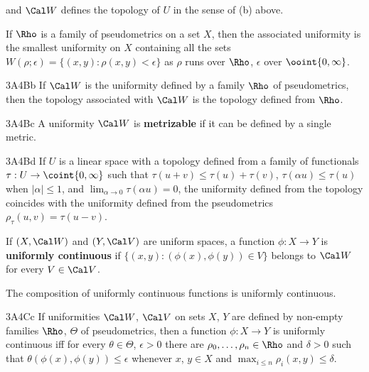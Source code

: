 \noindent and $\Cal W$ defines the topology of $U$ in the sense of (b) 
above.

 If $\Rho$ is a family
of pseudometrics on a set $X$, then the associated uniformity is the
smallest uniformity on $X$ containing all the sets
$W(\rho;\epsilon)=\{(x,y):\rho(x,y)<\epsilon\}$
as $\rho$ runs over $\Rho$, $\epsilon$ over $\ooint{0,\infty}$.

\spheader 3A4Bb If $\Cal W$ is the uniformity defined by a family $\Rho$
of pseudometrics, then the topology associated with $\Cal W$ is the
topology defined from $\Rho$.

\spheader 3A4Bc A uniformity $\Cal W$ is {\bf metrizable} if it can be
defined by a single metric.

\spheader 3A4Bd If $U$ is a linear space with a topology defined from a
family of functionals $\tau:U\to\coint{0,\infty}$ such that
$\tau(u+v)\le\tau(u)+\tau(v)$, $\tau(\alpha u)\le\tau(u)$ when
$|\alpha|\le 1$, and
$\lim_{\alpha\to 0}\tau(\alpha u)=0$, the
uniformity defined from the topology coincides with
the uniformity defined from the pseudometrics
$\rho_{\tau}(u,v)=\tau(u-v)$.   

 If $(X,\Cal W)$ and $(Y,\Cal V)$
are uniform spaces, a function $\phi:X\to Y$ is {\bf uniformly
continuous} if $\{(x,y):(\phi(x),\phi(y))\in V\}$ belongs to
$\Cal W$ for every $V\in\Cal V$.

 The composition of uniformly continuous
functions is uniformly continuous.

\spheader 3A4Cc If uniformities $\Cal W$, $\Cal V$ on sets $X$, $Y$ are
defined by
non-empty families $\Rho$, $\Theta$ of pseudometrics, then a function
$\phi:X\to Y$ is uniformly continuous iff for every $\theta\in\Theta$,
$\epsilon>0$ there are $\rho_0,\ldots,\rho_n\in\Rho$ and $\delta>0$ such
that $\theta(\phi(x),\phi(y))\le\epsilon$ whenever $x$, $y\in X$ and
$\max_{i\le n}\rho_i(x,y)\le\delta$.


